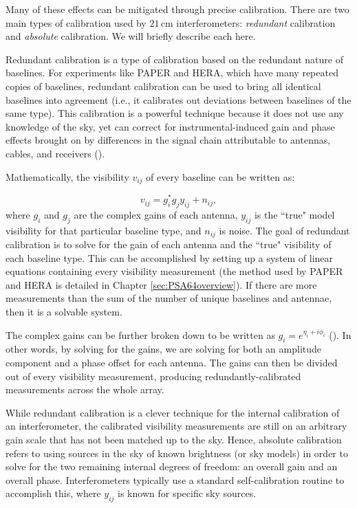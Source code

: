 Many of these effects can be mitigated through precise calibration. There are two main types of calibration used by $21$\,cm interferometers: \textit{redundant} calibration and \textit{absolute} calibration. We will briefly describe each here.

Redundant calibration is a type of calibration based on the redundant nature of baselines. For experiments like PAPER and HERA, which have many repeated copies of baselines, redundant calibration can be used to bring all identical baselines into agreement (i.e., it calibrates out deviations between baselines of the same type). This calibration is a powerful technique because it does not use any knowledge of the sky, yet can correct for instrumental-induced gain and phase effects brought on by differences in the signal chain attributable to antennas, cables, and receivers (\citealt{liu_et_al2010}).

Mathematically, the visibility $v_{ij}$ of every baseline can be written as:

\begin{equation}
\label{eq:gains}
v_{ij} = g_{i}^{\ast}g_{j}y_{ij} + n_{ij},
\end{equation}
where $g_{i}$ and $g_{j}$ are the complex gains of each antenna, $y_{ij}$ is the ``true" model visibility for that particular baseline type, and $n_{ij}$ is noise. The goal of redundant calibration is to solve for the gain of each antenna and the ``true" visibility of each baseline type. This can be accomplished by setting up a system of linear equations containing every visibility measurement (the method used by PAPER and HERA is detailed in Chapter \ref{sec:PSA64overview}). If there are more measurements than the sum of the number of unique baselines and antennae, then it is a solvable system. 

The complex gains can be further broken down to be written as $g_{i} = e^{\eta_{i} + i\phi_{i}}$ (\citealt{liu_et_al2010}). In other words, by solving for the gains, we are solving for both an amplitude component and a phase offset for each antenna. The gains can then be divided out of every visibility measurement, producing redundantly-calibrated measurements across the whole array.

While redundant calibration is a clever technique for the internal calibration of an interferometer, the calibrated visibility measurements are still on an arbitrary gain scale that has not been matched up to the sky. Hence, absolute calibration refers to using sources in the sky of known brightness (or sky models) in order to solve for the two remaining internal degrees of freedom: an overall gain and an overall phase. Interferometers typically use a standard self-calibration routine to accomplish this, where $y_{ij}$ is known for specific sky sources.

